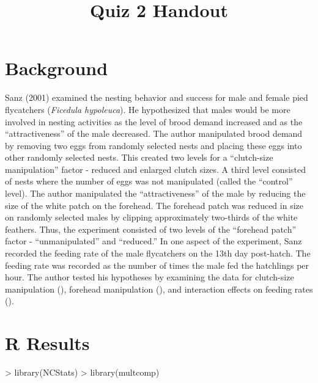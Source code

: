 \documentclass[a4paper]{article}
\begin{document}
\title{Quiz 2 Handout}
\date{}  %
\maketitle
\vspace{-36pt}


\vspace{-36pt}
\section*{Background}
Sanz (2001)  examined the nesting behavior and success for male and female pied flycatchers (\textit{Ficedula hypoleuca}).  He hypothesized that males would be more involved in nesting activities as the level of brood demand increased and as the ``attractiveness'' of the male decreased.  The author manipulated brood demand by removing two eggs from randomly selected nests and placing these eggs into other randomly selected nests.  This created two levels for a ``clutch-size manipulation'' factor - reduced and enlarged clutch sizes.  A third level consisted of nests where the number of eggs was not manipulated (called the ``control'' level).  The author manipulated the ``attractiveness'' of the male by reducing the size of the white patch on the forehead.  The forehead patch was reduced in size on randomly selected males by clipping approximately two-thirds of the white feathers.  Thus, the experiment consisted of two levels of the ``forehead patch'' factor - ``unmanipulated'' and ``reduced.''  In one aspect of the experiment, Sanz recorded the feeding rate of the male flycatchers on the 13th day post-hatch.  The feeding rate was recorded as the number of times the male fed the hatchlings per hour.  The author tested his hypotheses by examining the data for clutch-size manipulation (), forehead manipulation (), and interaction effects on feeding rates ().

\section*{R Results}
\begin{Schunk}
\begin{Sinput}
> library(NCStats)
> library(multcomp)
\end{Sinput}
\end{Schunk}

\vspace{-18pt}
\end{document}
